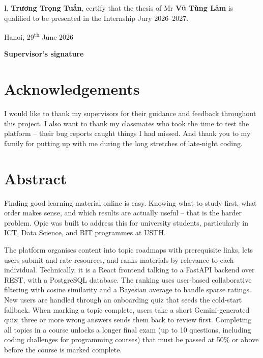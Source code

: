 \documentclass[12pt,a4paper]{report}
\begin{document}
\vspace{1cm}

\noindent I, \textbf{Trương Trọng Tuấn}, certify that the thesis of Mr \textbf{Vũ Tùng Lâm} is qualified to be presented in the Internship Jury 2026--2027.

\vspace{5cm}

\begin{flushright}
Hanoi, 29\textsuperscript{th} June 2026

\vspace{2cm}

\textbf{Supervisor's signature}
\end{flushright}

\newpage
\chapter*{Acknowledgements}

I would like to thank my supervisors for their guidance and feedback throughout this project. I also want to thank my classmates who took the time to test the platform -- their bug reports caught things I had missed. And thank you to my family for putting up with me during the long stretches of late-night coding.

\newpage
\chapter*{Abstract}

Finding good learning material online is easy. Knowing what to study first, what order makes sense, and which results are actually useful -- that is the harder problem. Opic was built to address this for university students, particularly in ICT, Data Science, and BIT programmes at USTH.

The platform organises content into topic roadmaps with prerequisite links, lets users submit and rate resources, and ranks materials by relevance to each individual. Technically, it is a React frontend talking to a FastAPI backend over REST, with a PostgreSQL database. The ranking uses user-based collaborative filtering with cosine similarity and a Bayesian average to handle sparse ratings. New users are handled through an onboarding quiz that seeds the cold-start fallback. When marking a topic complete, users take a short Gemini-generated quiz; three or more wrong answers sends them back to review first. Completing all topics in a course unlocks a longer final exam (up to 10 questions, including coding challenges for programming courses) that must be passed at 50\% or above before the course is marked complete.
\end{document}
